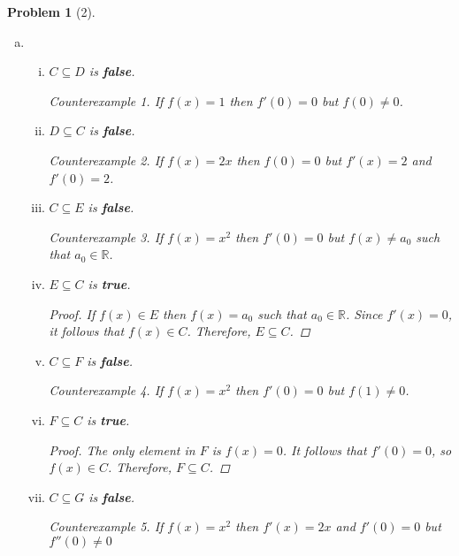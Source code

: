 \documentclass{article}
\theoremstyle{problem}
\newtheorem{prob}{Problem}
\theoremstyle{plain}
\theoremstyle{remark}
\newtheorem{countex}{Counterexample}
\begin{document}
\begin{prob}[2]
\begin{enumerate}[a)]
      \item 
        \begin{enumerate}[i.]
        \item $C \subseteq D$ is \textbf{false}.
          \begin{countex}
            If $f(x) = 1$ then $f'(0) = 0$ but $f(0) \not = 0$.
          \end{countex}
        \item $D \subseteq C$ is \textbf{false}.
          \begin{countex}
            If $f(x) = 2x$ then $f(0) = 0$ but $f'(x) = 2$ and $f'(0) = 2$.
          \end{countex}
        \item $C \subseteq E$ is \textbf{false}.
          \begin{countex}
            If $f(x) = x^2$ then $f'(0) = 0$ but $f(x) \not = a_0$ such that $a_0 \in \mathbb{R}$.
          \end{countex}
        \item $E \subseteq C$ is \textbf{true}.
          \begin{proof}
            If $f(x) \in E$ then $f(x) = a_0$ such that $a_0 \in \mathbb{R}$. Since $f'(x) = 0$, it follows that $f(x) \in C$. Therefore, $E \subseteq C$.
          \end{proof}
        \item $C \subseteq F$ is \textbf{false}.
          \begin{countex}
            If $f(x) = x^2$ then $f'(0) = 0$ but $f(1) \not = 0$.
          \end{countex}
        \item $F \subseteq C$ is \textbf{true}.
          \begin{proof}
            The only element in $F$ is $f(x) = 0$. It follows that $f'(0) = 0$, so $f(x) \in C$. Therefore, $F \subseteq C$.
          \end{proof}
        \item $C \subseteq G$ is \textbf{false}.
          \begin{countex}
            If $f(x) = x^2$ then $f'(x) = 2x$ and $f'(0) = 0$ but $f''(0) \not = 0$
          \end{countex}


\end{enumerate}
\end{enumerate}
\end{prob}
\end{document}
